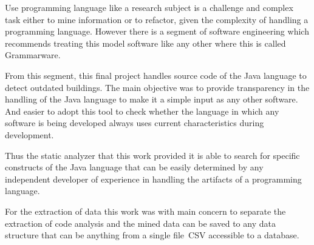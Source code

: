 Use programming language like a research subject is a challenge and complex task either to mine information or to refactor, given the complexity of handling a programming language. However there is a segment of software engineering which recommends treating this model software like any other where this is called Grammarware.

From this segment, this final project handles source code of the Java language to detect outdated buildings. The main objective was to provide transparency in the handling of the Java language to make it a simple input as any other software. And easier to adopt this tool to check whether the language in which any software is being developed always uses current characteristics during development.

Thus the static analyzer that this work provided it is able to search for specific constructs of the Java language that can be easily determined by any independent developer of experience in handling the artifacts of a programming language.

For the extraction of data this work was with main concern to separate the extraction of code analysis and the mined data can be saved to any data structure that can be anything from a single file~\acs{CSV} accessible to a database.




